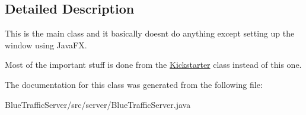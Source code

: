 \subsection{Detailed Description}
This is the main class and it basically doesn\textquotesingle{}t do anything except setting up the window using Java\+FX.

Most of the important stuff is done from the \hyperlink{classserver_1_1_kickstarter}{Kickstarter} class instead of this one. 

The documentation for this class was generated from the following file\+:\begin{DoxyCompactItemize}
\item 
Blue\+Traffic\+Server/src/server/Blue\+Traffic\+Server.\+java\end{DoxyCompactItemize}
